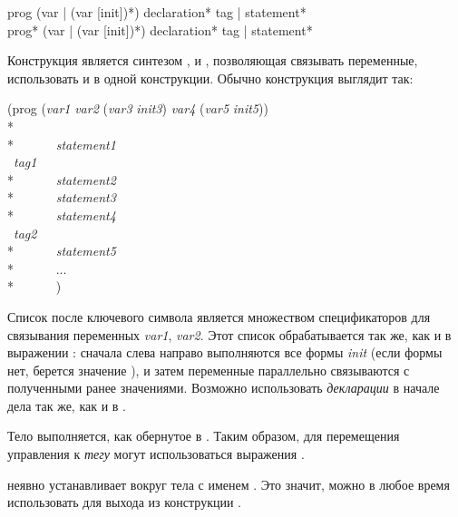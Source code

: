 \begin{defmac}
prog ({var | (var [init])}*) {declaration}* {tag | statement}* \\
prog* ({var | (var [init])}*) {declaration}* {tag | statement}*

Конструкция  является синтезом ,  и ,
позволяющая связывать переменные, использовать  и  в одной
конструкции. Обычно конструкция  выглядит так:
\begin{lisp}
(prog (\emph{var1} \emph{var2} (\emph{var3} \emph{init3}) \emph{var4} (\emph{var5} \emph{init5})) \\*
~~~~~~ \\*
~~~~~~\emph{statement1} \\
~\emph{tag1} \\*
~~~~~~\emph{statement2} \\*
~~~~~~\emph{statement3} \\*
~~~~~~\emph{statement4} \\
~\emph{tag2} \\*
~~~~~~\emph{statement5} \\*
~~~~~~... \\*
~~~~~~)
\end{lisp}
Список после ключевого символа  является множеством спецификаторов для
связывания переменных \emph{var1}, \emph{var2}.
Этот список обрабатывается так же, как и в выражении :
сначала слева направо выполняются все формы \emph{init} (если формы нет, берется
значение {\false}), и затем переменные параллельно связываются с полученными
ранее значениями. 
Возможно использовать \emph{декларации} в начале дела  так же, как и в
.

Тело  выполняется, как обернутое в . Таким образом, для
перемещения управления к \emph{тегу} могут использоваться выражения .

 неявно устанавливает вокруг тела  с именем {\nil}. Это
значит, можно в любое время использовать  для выхода из конструкции .


\end{defmac}
